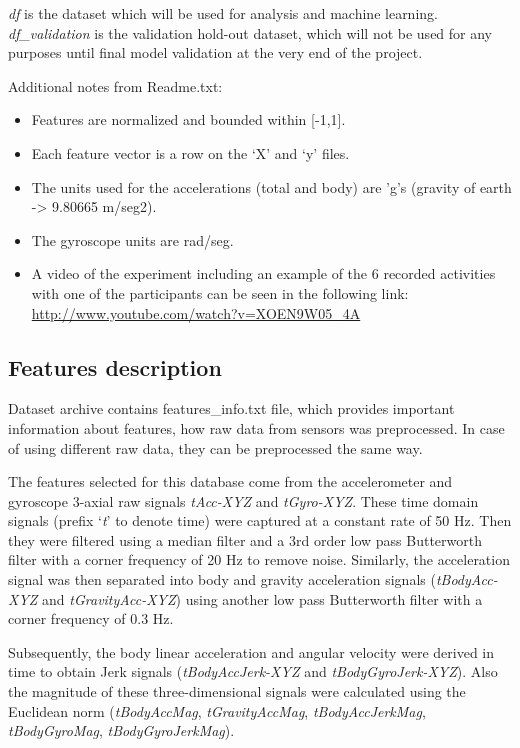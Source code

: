 \documentclass[
]{article}
\begin{document}
\emph{df} is the dataset which will be used for analysis and machine
learning. \emph{df\_validation} is the validation hold-out dataset,
which will not be used for any purposes until final model validation at
the very end of the project.

Additional notes from Readme.txt:

\begin{itemize}
\item
  Features are normalized and bounded within {[}-1,1{]}.
\item
  Each feature vector is a row on the `X' and `y' files.
\item
  The units used for the accelerations (total and body) are 'g's
  (gravity of earth -\textgreater{} 9.80665 m/seg2).
\item
  The gyroscope units are rad/seg.
\item
  A video of the experiment including an example of the 6 recorded
  activities with one of the participants can be seen in the following
  link: \url{http://www.youtube.com/watch?v=XOEN9W05_4A}
\end{itemize}

\hypertarget{features-description}{%
\subsection{Features description}\label{features-description}}

Dataset archive contains features\_info.txt file, which provides
important information about features, how raw data from sensors was
preprocessed. In case of using different raw data, they can be
preprocessed the same way.

The features selected for this database come from the accelerometer and
gyroscope 3-axial raw signals \emph{tAcc-XYZ} and \emph{tGyro-XYZ}.
These time domain signals (prefix `\emph{t}' to denote time) were
captured at a constant rate of 50 Hz. Then they were filtered using a
median filter and a 3rd order low pass Butterworth filter with a corner
frequency of 20 Hz to remove noise. Similarly, the acceleration signal
was then separated into body and gravity acceleration signals
(\emph{tBodyAcc-XYZ} and \emph{tGravityAcc-XYZ}) using another low pass
Butterworth filter with a corner frequency of 0.3 Hz.

Subsequently, the body linear acceleration and angular velocity were
derived in time to obtain Jerk signals (\emph{tBodyAccJerk-XYZ} and
\emph{tBodyGyroJerk-XYZ}). Also the magnitude of these three-dimensional
signals were calculated using the Euclidean norm (\emph{tBodyAccMag},
\emph{tGravityAccMag}, \emph{tBodyAccJerkMag}, \emph{tBodyGyroMag},
\emph{tBodyGyroJerkMag}).
\end{document}
